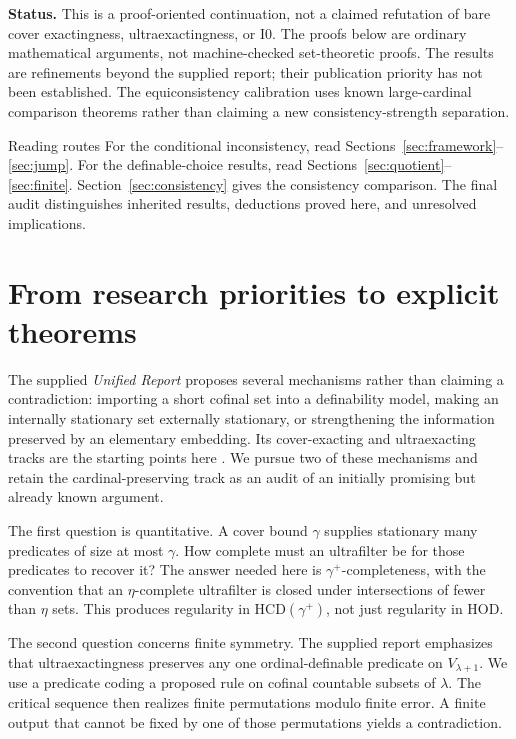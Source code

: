 \documentclass[11pt,letterpaper]{article}
\theoremstyle{definition}
\newcommand{\Izero}{\mathrm{I0}}
\newcommand{\HCD}{\mathrm{HCD}}
\begin{document}
\textbf{Status.} This is a proof-oriented continuation, not a claimed refutation of bare cover exactingness, ultraexactingness, or $\Izero$. The proofs below are ordinary mathematical arguments, not machine-checked set-theoretic proofs. The results are refinements beyond the supplied report; their publication priority has not been established. The equiconsistency calibration uses known large-cardinal comparison theorems rather than claiming a new consistency-strength separation.

\clearpage
\tableofcontents
\vspace{10pt}
\begin{assessment}{Reading routes}
For the conditional inconsistency, read Sections~\ref{sec:framework}--\ref{sec:jump}. For the definable-choice results, read Sections~\ref{sec:quotient}--\ref{sec:finite}. Section~\ref{sec:consistency} gives the consistency comparison. The final audit distinguishes inherited results, deductions proved here, and unresolved implications.
\end{assessment}

\clearpage
\section{From research priorities to explicit theorems}\label{sec:overview}

The supplied \emph{Unified Report} proposes several mechanisms rather than claiming a contradiction: importing a short cofinal set into a definability model, making an internally stationary set externally stationary, or strengthening the information preserved by an elementary embedding. Its cover-exacting and ultraexacting tracks are the starting points here \cite{unified}. We pursue two of these mechanisms and retain the cardinal-preserving track as an audit of an initially promising but already known argument.

The first question is quantitative. A cover bound $\gamma$ supplies stationary many predicates of size at most $\gamma$. How complete must an ultrafilter be for those predicates to recover it? The answer needed here is $\gamma^+$-completeness, with the convention that an $\eta$-complete ultrafilter is closed under intersections of fewer than $\eta$ sets. This produces regularity in $\HCD(\gamma^+)$, not just regularity in HOD.

The second question concerns finite symmetry. The supplied report emphasizes that ultraexactingness preserves any one ordinal-definable predicate on $V_{\lambda+1}$. We use a predicate coding a proposed rule on cofinal countable subsets of $\lambda$. The critical sequence then realizes finite permutations modulo finite error. A finite output that cannot be fixed by one of those permutations yields a contradiction.
\end{document}
